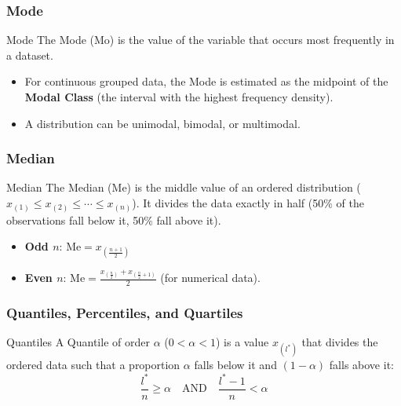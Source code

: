 \subsubsection{Mode}

\begin{defbox}{Mode}
The Mode (Mo) is the value of the variable that occurs most frequently in a dataset. 
\end{defbox}

\begin{itemize}
    \item For continuous grouped data, the Mode is estimated as the midpoint of the \textbf{Modal Class} (the interval with the highest frequency density).
    \item A distribution can be unimodal, bimodal, or multimodal.
\end{itemize}

\vs


\subsubsection{Median}

\begin{defbox}{Median}
The Median (Me) is the middle value of an ordered distribution ($x_{(1)} \leq x_{(2)} \leq \cdots \leq x_{(n)}$). It divides the data exactly in half (50\% of the observations fall below it, 50\% fall above it).
\end{defbox}

\begin{itemize}
    \item \textbf{Odd $n$}: $\text{Me} = x_{\left(\frac{n+1}{2}\right)}$
    \item \textbf{Even $n$}: $\text{Me} = \frac{x_{\left(\frac{n}{2}\right)} + x_{\left(\frac{n}{2}+1\right)}}{2}$ (for numerical data).
\end{itemize}


\subsubsection{Quantiles, Percentiles, and Quartiles}

\begin{defbox}{Quantiles}
A Quantile of order $\alpha$ ($0 < \alpha < 1$) is a value $x_{(l^*)}$ that divides the ordered data such that a proportion $\alpha$ falls below it and $(1-\alpha)$ falls above it:
\begin{equation}
    \frac{l^*}{n} \geq \alpha \quad \text{AND} \quad \frac{l^*-1}{n} < \alpha
\end{equation}
\end{defbox}

